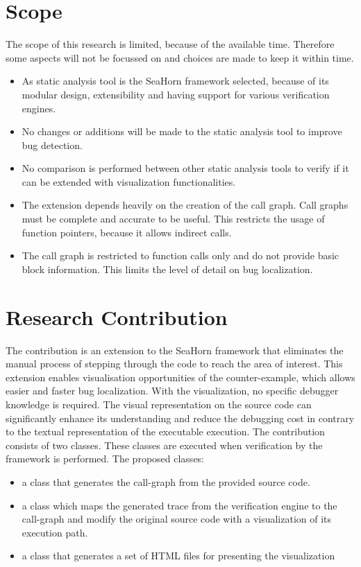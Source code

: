 \section{Scope}
The scope of this research is limited, because of the available time. Therefore some aspects will not be focussed on and choices are made to keep it within time.
\begin{itemize}
\item As static analysis tool is the SeaHorn framework selected, because of its modular design, extensibility and having support for various verification engines.
\item No changes or additions will be made to the static analysis tool to improve bug detection.
\item No comparison is performed between other static analysis tools to verify if it can be extended with visualization functionalities.
\item The extension depends heavily on the creation of the call graph. Call graphs must be complete and accurate to be useful. This restricts the usage of function pointers, because it allows indirect calls.
\item The call graph is restricted to function calls only and do not provide basic block information. This limits the level of detail on bug localization. 
\end{itemize}
\section{Research Contribution}
The contribution is an extension to the SeaHorn framework that eliminates the manual process of stepping through the code to reach the area of interest. This extension enables visualisation opportunities of the counter-example, which allows easier and faster bug localization. With the visualization, no specific debugger  knowledge is required. The visual representation on the source code can significantly enhance its understanding and reduce the debugging cost in contrary to the textual representation of the executable execution. \newline \newline
The contribution consists of two classes. These classes are executed when verification by the framework is performed. \newline \newline
The proposed classes:
\begin{itemize}
\item a class that generates the call-graph from the provided source code.
\item a class which maps the generated trace from the verification engine to the call-graph and modify the original source code with a visualization of its execution path.
\item a class that generates a set of HTML files for presenting the visualization
\end{itemize}

